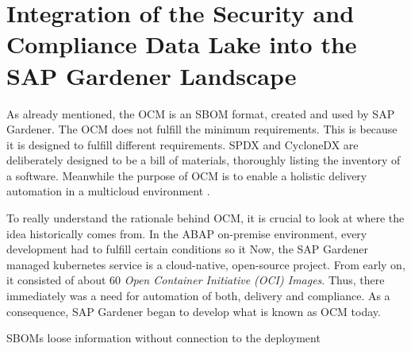 \section{Integration of the Security and Compliance Data Lake into the SAP Gardener Landscape}
As already mentioned, the OCM is an SBOM format, created and used by SAP Gardener. The OCM does not fulfill the minimum requirements. This is because it is designed to fulfill different requirements. SPDX and CycloneDX are deliberately designed to be a bill of materials, thoroughly listing the inventory of a software. Meanwhile the purpose of OCM is to enable a holistic delivery automation in a multicloud environment \cite{OCMInternalPresentation}.\par
To really understand the rationale behind OCM, it is crucial to look at where the idea historically comes from. In the ABAP on-premise environment, every development had to fulfill certain conditions so it 
Now, the SAP Gardener managed kubernetes service is a cloud-native, open-source project. From early on, it consisted of about 60 \textit{Open Container Initiative (OCI) Images}. Thus, there immediately was a need for automation of both, delivery and compliance. As a consequence, SAP Gardener began to develop what is known as OCM today.

SBOMs loose information without connection to the deployment

